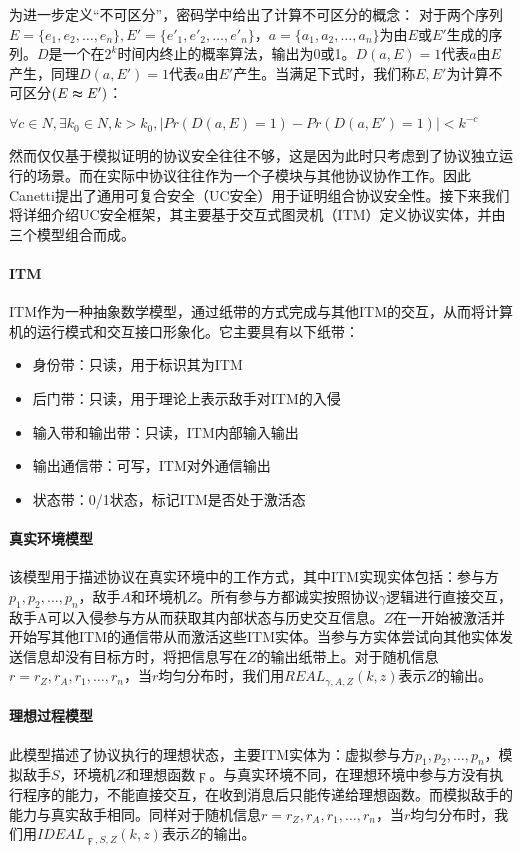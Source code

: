 为进一步定义“不可区分”，密码学中给出了计算不可区分的概念：
对于两个序列$E=\{e_1, e_2, \dots, e_n\}, E' = \{e'_1, e'_2, \dots, e'_n\}$，$a=\{a_1, a_2, \dots, a_n\}$为由$E$或$E'$生成的序列。$D$是一个在$2^k$时间内终止的概率算法，输出为0或1。$D(a, E) = 1$代表$a$由$E$产生，同理$D(a, E')=1$代表$a$由$E'$产生。当满足下式时，我们称$E, E'$为计算不可区分$(E \thickapprox E')$：
\begin{center}
    $\forall c \in N, \exists k_0 \in N, k > k_0, |Pr(D(a, E)=1) - Pr(D(a, E')=1)| < k^{-c}$
\end{center}

然而仅仅基于模拟证明的协议安全往往不够，这是因为此时只考虑到了协议独立运行的场景。而在实际中协议往往作为一个子模块与其他协议协作工作。因此Canetti提出了通用可复合安全（UC安全）用于证明组合协议安全性\cite{959888}。接下来我们将详细介绍UC安全框架，其主要基于交互式图灵机（ITM）定义协议实体，并由三个模型组合而成。

\paragraph{ITM}
ITM\cite{959888}作为一种抽象数学模型，通过纸带的方式完成与其他ITM的交互，从而将计算机的运行模式和交互接口形象化。它主要具有以下纸带：
\begin{itemize}
    \setlength{\itemsep}{0pt}
    \setlength{\parsep}{0pt}
    \setlength{\parskip}{0pt}
    \item 身份带：只读，用于标识其为ITM
    \item 后门带：只读，用于理论上表示敌手对ITM的入侵
    \item 输入带和输出带：只读，ITM内部输入输出
    \item 输出通信带：可写，ITM对外通信输出
    \item 状态带：0/1状态，标记ITM是否处于激活态
\end{itemize}
\paragraph{真实环境模型}
该模型用于描述协议在真实环境中的工作方式，其中ITM实现实体包括：参与方$p_1, p_2, \dots , p_n$，敌手$A$和环境机$Z$。所有参与方都诚实按照协议$\gamma$逻辑进行直接交互，敌手A可以入侵参与方从而获取其内部状态与历史交互信息。$Z$在一开始被激活并开始写其他ITM的通信带从而激活这些ITM实体。当参与方实体尝试向其他实体发送信息却没有目标方时，将把信息写在$Z$的输出纸带上。对于随机信息$r=r_Z, r_A, r_1, \dots, r_n$，当$r$均匀分布时，我们用$REAL_{\gamma, A, Z}(k, z)$表示$Z$的输出。
\paragraph{理想过程模型}
此模型描述了协议执行的理想状态，主要ITM实体为：虚拟参与方$p_1, p_2, \dots , p_n$，模拟敌手$S$，环境机$Z$和理想函数$\digamma$。与真实环境不同，在理想环境中参与方没有执行程序的能力，不能直接交互，在收到消息后只能传递给理想函数。而模拟敌手的能力与真实敌手相同。同样对于随机信息$r=r_Z, r_A, r_1, \dots, r_n$，当$r$均匀分布时，我们用$IDEAL_{\digamma, S, Z}(k, z)$表示$Z$的输出。

